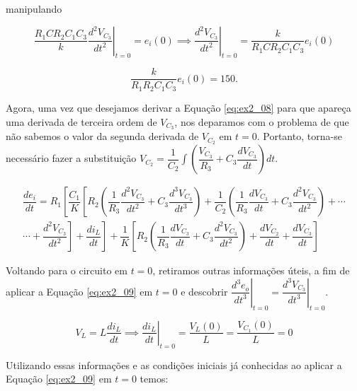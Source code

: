 \documentclass{article}
\numberwithin{equation}{section}
\newcommand{\deo}[1]{\dfrac{d^{#1}e_o}{dt^{#1}}}
\let\dfr\dfrac
\begin{document}
\noindent manipulando

\begin{equation}
    \left.\dfr{R_1CR_2C_1C_3}{k}\dfr{d^2V_{C_3}}{dt^2}\right|_{t=0} = e_i(0) \implies \left.\dfr{d^2V_{C_3}}{dt^2}\right|_{t=0} = \dfr{k}{R_1CR_2C_1C_3}e_i(0)
\end{equation}

\begin{equation}
    \dfr{k}{R_1R_2C_1C_3}e_i(0) = 150.
\end{equation}

\noindent Agora, uma vez que desejamos derivar a Equação \eqref{eq:ex2_08} para que apareça uma derivada de terceira ordem de $V_{C_3}$, nos deparamos com o problema de que não sabemos o valor da segunda derivada de $V_{C_2}$ em $t=0$. Portanto, torna-se necessário fazer a substituição $V_{C_2} = \dfr{1}{C_2}\displaystyle\int\left(\dfr{V_{C_3}}{R_3} +C_3\dfr{dV_{C_3}}{dt}\right)dt$.


\begin{equation}
    \label{eq:ex2_09}
    \begin{split}
        \dfr{de_i}{dt} =  R_1\left[\dfr{C_1}{K}\left[R_2\left(\dfr{1}{R_3}\dfr{d^2V_{C_3}}{dt^2}+C_3\dfr{d^3V_{C_3}}{dt^3}\right)+\dfr{1}{C_2}\left(\dfr{1}{R_3}\dfr{dV_{C_3}}{dt}+C_3\dfr{d^2V_{C_3}}{dt^2}\right)+\right.\right.\cdots\\
        \left.\left.\cdots+\dfr{d^2V_{C_3}}{dt^2}\right]+        \dfr{di_L}{dt}\right]+\dfr{1}{K}\left[R_2\left(\dfr{1}{R_3}\dfr{dV_{C_3}}{dt}+C_3\dfr{d^2V_{C_3}}{dt^2}\right)+\dfr{dV_{C_2}}{dt}+\dfr{dV_{C_3}}{dt}\right]
    \end{split}
\end{equation}

\noindent Voltando para o circuito em $t=0$, retiramos outras informações úteis, a fim de aplicar a Equação \eqref{eq:ex2_09} em $t=0$ e descobrir $\left.\deo{3}\right|_{t=0} = \left.\dfr{d^3V_{C_3}}{dt^3}\right|_{t=0}$.

\vspace{1.5mm}

\begin{equation*}
    V_L = L\dfr{di_L}{dt} \implies \left.\dfr{di_L}{dt}\right|_{t=0} = \dfr{V_L(0)}{L} = \dfr{V_{C_1}(0)}{L} = 0
\end{equation*}

\noindent Utilizando essas informações e as condições iniciais já conhecidas ao aplicar a Equação \eqref{eq:ex2_09} em $t=0$ temos:
\end{document}
